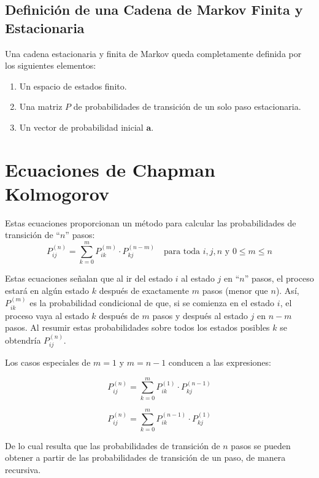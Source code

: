 \documentclass{article}
\begin{document}
\subsection*{Definición de una Cadena de Markov Finita y Estacionaria}

Una cadena estacionaria y finita de Markov queda completamente definida por los siguientes elementos:
\begin{enumerate}
    \item Un espacio de estados finito.
    \item Una matriz \( P \) de probabilidades de transición de un solo paso estacionaria.
    \item Un vector de probabilidad inicial \( \mathbf{a} \).
\end{enumerate}

\section{Ecuaciones de Chapman Kolmogorov}

Estas ecuaciones proporcionan un método para calcular las probabilidades de transición de ``\(n\)'' pasos:
\[
    P_{ij}^{(n)} = \sum_{k=0}^{m} P_{ik}^{(m)} \cdot P_{kj}^{(n-m)} \quad \text{para toda } i, j, n \text{ y } 0 \leq m \leq n
\]

Estas ecuaciones señalan que al ir del estado \(i\) al estado \(j\) en ``\(n\)'' pasos, el proceso estará en algún estado \(k\) después de exactamente \(m\) pasos (menor que \(n\)). Así, \(P_{ik}^{(m)}\) es la probabilidad condicional de que, si se comienza en el estado \(i\), el proceso vaya al estado \(k\) después de \(m\) pasos y después al estado \(j\) en \(n-m\) pasos. Al resumir estas probabilidades sobre todos los estados posibles \(k\) se obtendría \(P_{ij}^{(n)}\).

Los casos especiales de \( m=1 \) y \( m=n-1 \) conducen a las expresiones:

\begin{equation}
    P_{ij}^{(n)} = \sum_{k=0}^{m} P_{ik}^{(1)} \cdot P_{kj}^{(n-1)}
\end{equation}

\begin{equation}
    P_{ij}^{(n)} = \sum_{k=0}^{m} P_{ik}^{(n-1)} \cdot P_{kj}^{(1)}
\end{equation}

De lo cual resulta que las probabilidades de transición de \( n \) pasos se pueden obtener a partir de las probabilidades de transición de un paso, de manera recursiva.
\end{document}
